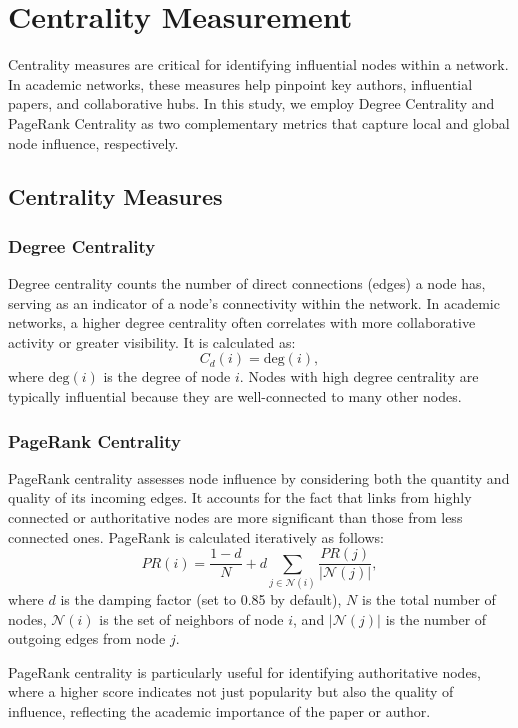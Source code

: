 \documentclass[11pt]{article}
\begin{document}
\section{Centrality Measurement}

Centrality measures are critical for identifying influential nodes within a network. In academic networks, these measures help pinpoint key authors, influential papers, and collaborative hubs. In this study, we employ Degree Centrality and PageRank Centrality as two complementary metrics that capture local and global node influence, respectively.

\subsection{Centrality Measures}

\subsubsection{Degree Centrality}

Degree centrality counts the number of direct connections (edges) a node has, serving as an indicator of a node's connectivity within the network. In academic networks, a higher degree centrality often correlates with more collaborative activity or greater visibility. It is calculated as:
\[
C_d(i) = \text{deg}(i),
\]
where \( \text{deg}(i) \) is the degree of node \( i \). Nodes with high degree centrality are typically influential because they are well-connected to many other nodes.

\subsubsection{PageRank Centrality}

PageRank centrality assesses node influence by considering both the quantity and quality of its incoming edges. It accounts for the fact that links from highly connected or authoritative nodes are more significant than those from less connected ones. PageRank is calculated iteratively as follows:
\[
PR(i) = \frac{1 - d}{N} + d \sum_{j \in \mathcal{N}(i)} \frac{PR(j)}{|\mathcal{N}(j)|},
\]
where \( d \) is the damping factor (set to 0.85 by default), \( N \) is the total number of nodes, \( \mathcal{N}(i) \) is the set of neighbors of node \( i \), and \( |\mathcal{N}(j)| \) is the number of outgoing edges from node \( j \).

PageRank centrality is particularly useful for identifying authoritative nodes, where a higher score indicates not just popularity but also the quality of influence, reflecting the academic importance of the paper or author.
\end{document}

